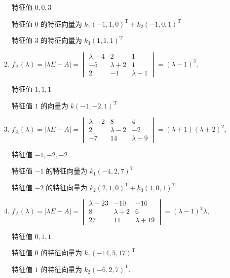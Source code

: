 \begin{enumerate}
                   特征值 \( 0, 0, 3 \)

                   特征值 \( 0 \) 的特征向量为 \( k_1(-1, 1, 0)^{\mathrm{T}} + k_2(-1, 0, 1)^{\mathrm{T}} \)

                   特征值 \( 3 \) 的特征向量为 \( k_3(1, 1, 1)^{\mathrm{T}} \)
             \item %
                   \( f_{A}(\lambda) = |\lambda E - A| = \begin{vmatrix}
                       \lambda - 4 & 2           & 1           \\
                       -5          & \lambda + 2 & 1           \\
                       2           & -1          & \lambda - 1
                   \end{vmatrix} = (\lambda - 1)^{3} \),

                   特征值 \( 1, 1, 1 \)

                   特征值 \( 1 \) 的向量为 \( k(-1, -2, 1)^{\mathrm{T}} \)
             \item %
                   \( f_{A}(\lambda) = |\lambda E - A| = \begin{vmatrix}
                       \lambda - 2 & 8           & 4           \\
                       2           & \lambda - 2 & -2          \\
                       -7          & 14          & \lambda + 9
                   \end{vmatrix} = (\lambda + 1)(\lambda + 2)^{2} \),

                   特征值 \( -1, -2, -2 \)

                   特征值 \( -1 \) 的特征向量为 \( k_1(-4, 2, 7)^{\mathrm{T}} \)

                   特征值 \( -2 \) 的特征向量为 \( k_2(2, 1, 0)^{\mathrm{T}} + k_3(1, 0, 1)^{\mathrm{T}} \)
             \item %
                   \( f_{A}(\lambda) = |\lambda E - A| = \begin{vmatrix}
                       \lambda - 23 & -10         & -16          \\
                       8            & \lambda + 2 & 6            \\
                       27           & 11          & \lambda + 19
                   \end{vmatrix} = (\lambda - 1)^{2}\lambda \),

                   特征值 \( 0, 1, 1 \)

                   特征值 \( 0 \) 的特征向量为 \( k_1(-14, 5, 17)^{\mathrm{T}} \)

                   特征值 \( 1 \) 的特征向量为 \( k_2(-6, 2, 7)^{\mathrm{T}} \).
         \end{enumerate}

